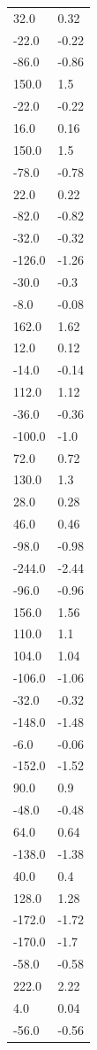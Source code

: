 \begin{longtable}{ll}
32.0 & 0.32 \\
-22.0 & -0.22 \\
-86.0 & -0.86 \\
150.0 & 1.5 \\
-22.0 & -0.22 \\
16.0 & 0.16 \\
150.0 & 1.5 \\
-78.0 & -0.78 \\
22.0 & 0.22 \\
-82.0 & -0.82 \\
-32.0 & -0.32 \\
-126.0 & -1.26 \\
-30.0 & -0.3 \\
-8.0 & -0.08 \\
162.0 & 1.62 \\
12.0 & 0.12 \\
-14.0 & -0.14 \\
112.0 & 1.12 \\
-36.0 & -0.36 \\
-100.0 & -1.0 \\
72.0 & 0.72 \\
130.0 & 1.3 \\
28.0 & 0.28 \\
46.0 & 0.46 \\
-98.0 & -0.98 \\
-244.0 & -2.44 \\
-96.0 & -0.96 \\
156.0 & 1.56 \\
110.0 & 1.1 \\
104.0 & 1.04 \\
-106.0 & -1.06 \\
-32.0 & -0.32 \\
-148.0 & -1.48 \\
-6.0 & -0.06 \\
-152.0 & -1.52 \\
90.0 & 0.9 \\
-48.0 & -0.48 \\
64.0 & 0.64 \\
-138.0 & -1.38 \\
40.0 & 0.4 \\
128.0 & 1.28 \\
-172.0 & -1.72 \\
-170.0 & -1.7 \\
-58.0 & -0.58 \\
222.0 & 2.22 \\
4.0 & 0.04 \\
-56.0 & -0.56 \\

\end{longtable}

